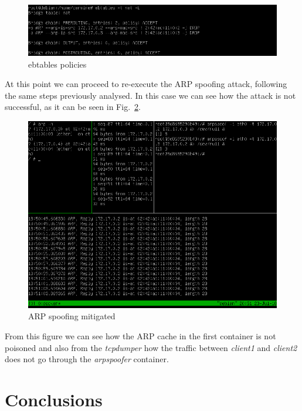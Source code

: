 \documentclass[a4paper,12pt]{article}
\def\myfig#1{Fig.~#1\xspace}
\begin{document}
\begin{figure}[ht!]
  \centerline{\includegraphics[width=1\textwidth]{ebtables_policies.png}}
  \caption{ebtables policies}
  \label{fig:ebtables_policies}
\end{figure}

At this point we can proceed to re-execute the ARP spoofing attack, following
the same steps previously analysed. In this case we can see how the attack is
not successful, as it can be seen in \myfig{\ref{fig:ARP_mitigated}}.

\begin{figure}[ht!]
  \centerline{\includegraphics[width=1\textwidth]{ARP_mitigated.png}}
  \caption{ARP spoofing mitigated}
  \label{fig:ARP_mitigated}
\end{figure}

From this figure we can see how the ARP cache in the first container is not
poisoned and also from the \textit{tcpdumper} how the traffic between
\textit{client1} and \textit{client2} does not go through the
\textit{arpspoofer} container.


\clearpage

\section{Conclusions}
\label{sec:conclusions}
\end{document}
